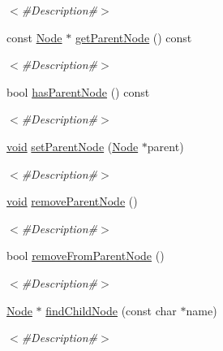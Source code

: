 \begin{DoxyCompactItemize}
\begin{DoxyCompactList}\small\item\em $<$\#\+Description\#$>$ \end{DoxyCompactList}\item 
const \mbox{\hyperlink{classnjli_1_1_node}{Node}} $\ast$ \mbox{\hyperlink{classnjli_1_1_node_a30973b8e0601decafa4a1b0fdc9eef50}{get\+Parent\+Node}} () const
\begin{DoxyCompactList}\small\item\em $<$\#\+Description\#$>$ \end{DoxyCompactList}\item 
bool \mbox{\hyperlink{classnjli_1_1_node_a4151e924a1b2b558976c062345d7edd6}{has\+Parent\+Node}} () const
\begin{DoxyCompactList}\small\item\em $<$\#\+Description\#$>$ \end{DoxyCompactList}\item 
\mbox{\hyperlink{_thread_8h_af1e856da2e658414cb2456cb6f7ebc66}{void}} \mbox{\hyperlink{classnjli_1_1_node_adb9348e3765aacbabc94297e39a0ce16}{set\+Parent\+Node}} (\mbox{\hyperlink{classnjli_1_1_node}{Node}} $\ast$parent)
\begin{DoxyCompactList}\small\item\em $<$\#\+Description\#$>$ \end{DoxyCompactList}\item 
\mbox{\hyperlink{_thread_8h_af1e856da2e658414cb2456cb6f7ebc66}{void}} \mbox{\hyperlink{classnjli_1_1_node_ac2ea52a338582bd41fef29230107049a}{remove\+Parent\+Node}} ()
\begin{DoxyCompactList}\small\item\em $<$\#\+Description\#$>$ \end{DoxyCompactList}\item 
bool \mbox{\hyperlink{classnjli_1_1_node_a100119ca086dab1c33416fad1d885e11}{remove\+From\+Parent\+Node}} ()
\begin{DoxyCompactList}\small\item\em $<$\#\+Description\#$>$ \end{DoxyCompactList}\item 
\mbox{\hyperlink{classnjli_1_1_node}{Node}} $\ast$ \mbox{\hyperlink{classnjli_1_1_node_af58461a0154d4e1281ea75ee5d553164}{find\+Child\+Node}} (const char $\ast$name)
\begin{DoxyCompactList}\small\item\em $<$\#\+Description\#$>$ \end{DoxyCompactList}\item 

\end{DoxyCompactItemize}
